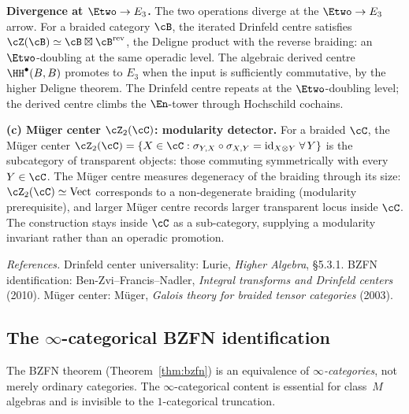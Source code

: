 \begin{remark}
\noindent\textbf{Divergence at $\Etwo \to E_3$.}
The two operations diverge at the $\Etwo \to E_3$ arrow. For a braided category
$\cB$, the iterated Drinfeld centre satisfies
$\cZ(\cB) \simeq \cB \boxtimes \cB^{\mathrm{rev}}$, the Deligne
product with the reverse braiding: an $\Etwo$-doubling at the same
operadic level. The algebraic derived centre $\HH^\bullet(B, B)$
promotes to $E_3$ when the input is sufficiently commutative, by the
higher Deligne theorem. The Drinfeld centre repeats at the
$\Etwo$-doubling level; the derived centre climbs the $\En$-tower
through Hochschild cochains.

\noindent\textbf{(c) M\"uger center $\cZ_2(\cC)$: modularity detector.}
For a braided $\cC$, the M\"uger center
$\cZ_2(\cC) = \{X \in \cC : \sigma_{Y, X} \circ \sigma_{X, Y} = \mathrm{id}_{X \otimes Y}\;
\forall\, Y\}$ is the subcategory of transparent objects: those
commuting symmetrically with every $Y \in \cC$. The M\"uger centre
measures degeneracy of the braiding through its size:
$\cZ_2(\cC) \simeq \mathrm{Vect}$ corresponds to a non-degenerate
braiding (modularity prerequisite), and larger M\"uger centre records
larger transparent locus inside $\cC$. The construction stays inside
$\cC$ as a sub-category, supplying a modularity invariant rather than
an operadic promotion.

\noindent\emph{References.}
Drinfeld center universality: Lurie, \emph{Higher Algebra},
\S5.3.1. BZFN identification: Ben-Zvi--Francis--Nadler,
\emph{Integral transforms and Drinfeld centers} (2010).
M\"uger center: M\"uger, \emph{Galois theory for braided
tensor categories} (2003).
\end{remark}
\subsection{The \texorpdfstring{$\infty$}{inf}-categorical BZFN identification}
\label{subsec:infty-cat-bzfn}

The BZFN theorem (Theorem~\ref{thm:bzfn}) is an equivalence of
\emph{$\infty$-categories}, not merely ordinary categories. The
$\infty$-categorical content is essential for class~$M$ algebras
and is invisible to the $1$-categorical truncation.

